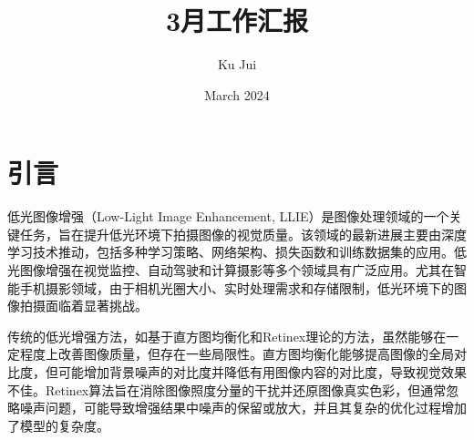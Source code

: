 \documentclass[a4paper, 10pt]{article}
\begin{document}
	
	
	\title{\songti {}3月工作汇报}
	\author{\textrm{Ku Jui}}
	\date{\textrm{March 2024}}
	\maketitle
	
	\renewcommand{\figurename}{Figure} %
	
	\renewcommand{\tablename}{Table}
	
	\renewcommand{\cfttoctitlefont}{\hfill\Large\bfseries\songti}
	\renewcommand{\cftaftertoctitle}{\hfill}
	\renewcommand{\contentsname}{Content}
		
	\tableofcontents
	
	\newpage	
	
	\section{引言}
		
		低光图像增强（Low-Light Image Enhancement, LLIE）是图像处理领域的一个关键任务，旨在提升低光环境下拍摄图像的视觉质量。该领域的最新进展主要由深度学习技术推动，包括多种学习策略、网络架构、损失函数和训练数据集的应用。低光图像增强在视觉监控、自动驾驶和计算摄影等多个领域具有广泛应用。尤其在智能手机摄影领域，由于相机光圈大小、实时处理需求和存储限制，低光环境下的图像拍摄面临着显著挑战。
		
		传统的低光增强方法，如基于直方图均衡化\cite{ji1994adaptive}和Retinex理论\cite{land1965, land1977retinex, jobson1997properties}的方法，虽然能够在一定程度上改善图像质量，但存在一些局限性。直方图均衡化能够提高图像的全局对比度，但可能增加背景噪声的对比度并降低有用图像内容的对比度，导致视觉效果不佳。Retinex算法旨在消除图像照度分量的干扰并还原图像真实色彩，但通常忽略噪声问题，可能导致增强结果中噪声的保留或放大，并且其复杂的优化过程增加了模型的复杂度。
		
\end{document}

